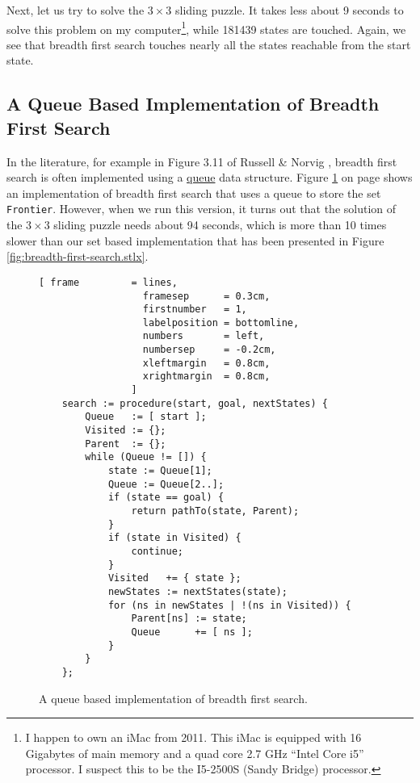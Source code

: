 Next, let us try to solve the $3 \times 3$ sliding puzzle.  It takes less about 9 seconds to solve
this problem on my computer\footnote{
  I happen to own an iMac from 2011.  This iMac is equipped with 16 Gigabytes of main memory and a
  quad core 2.7 GHz ``Intel Core i5'' processor.  I suspect this to be the I5-2500S (Sandy Bridge) processor.
}, while 181439 states are touched.  Again, we see that breadth first search touches nearly all the
states reachable from the start state.

\subsection{A Queue Based Implementation of Breadth First Search}
In the literature, for example in Figure 3.11 of Russell \& Norvig \cite{russell:2009}, breadth
first search is often implemented using a
\href{https://en.wikipedia.org/wiki/Queue_(abstract_data_type)}{queue} data structure.  
Figure \ref{fig:breadth-first-search-queue.stlx} on page
\pageref{fig:breadth-first-search-queue.stlx} shows an implementation of breadth first search that
uses a queue to store the set \texttt{Frontier}.  However, when we run this version, it turns out
that the solution of the $3 \times 3$ sliding puzzle needs about 94 seconds, which is more than
10 times slower than our set based implementation that has been presented in Figure
\ref{fig:breadth-first-search.stlx}.

\begin{figure}[!ht]
\centering
\begin{Verbatim}[ frame         = lines, 
                  framesep      = 0.3cm, 
                  firstnumber   = 1,
                  labelposition = bottomline,
                  numbers       = left,
                  numbersep     = -0.2cm,
                  xleftmargin   = 0.8cm,
                  xrightmargin  = 0.8cm,
                ]
    search := procedure(start, goal, nextStates) {
        Queue   := [ start ];
        Visited := {}; 
        Parent  := {};
        while (Queue != []) {
            state := Queue[1];
            Queue := Queue[2..];
            if (state == goal) {
                return pathTo(state, Parent);
            }
            if (state in Visited) {
                continue;
            }
            Visited   += { state };
            newStates := nextStates(state);
            for (ns in newStates | !(ns in Visited)) { 
                Parent[ns] := state;
                Queue      += [ ns ];
            }
        }
    };
\end{Verbatim}
\vspace*{-0.3cm}
\caption{A queue based implementation of breadth first search.}
\label{fig:breadth-first-search-queue.stlx}
\end{figure}

